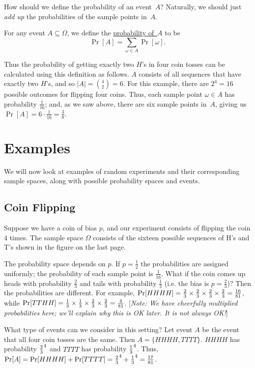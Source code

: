 \documentclass[11pt,fleqn]{article}
\begin{document}
How should we define the probability of an event~$A$?  Naturally,
we should just {\it add up\/} the probabilities of the sample points in~$A$.

For any event $A \subseteq \Omega$, we define the \underline{probability of~$A$}
to be $$
   \Pr[A] = \sum_{\omega\in A} \Pr[\omega].  $$

Thus the probability of getting exactly two $H$'s in four coin tosses
can be calculated using this definition as follows. $A$ consists of all
sequences that have exactly two $H$'s, and so $|A| ={4\choose 2}= 6$. 
For this example, there are $2^4 = 16$ possible outcomes for flipping four coins. 
Thus, each sample point $\omega \in A$ has probability $\frac{1}{16}$; and, as 
we saw above, there are six sample points in~$A$, giving us
$\Pr[A] = 6 \cdot \frac{1}{16} = \frac{3}{8}$.

\section*{Examples}

We will now look at examples of random experiments and 
their corresponding sample spaces, along with possible probability spaces and events. 

\subsection*{Coin Flipping}
Suppose we have a coin of bias $p$, and our experiment consists of flipping the coin $4$ times. 
The sample space $\Omega$ consists of the sixteen possible sequences of H's and T's shown 
in the figure on the last page. 

The probability space depends on $p$. If $p = \frac{1}{2}$ the probabilities are assigned uniformly; the probability
of each sample point is $\frac{1}{16}$. What if the coin comes up heads with
probability $\frac{2}{3}$ and tails with probability $\frac{1}{3}$ (i.e. the bias is $p = \frac{2}{3}$)?
Then the probabilities are different. 
For example,
$\Pr[HHHH]={2\over 3}\times{2\over 3}\times{2\over 3}\times{2\over 3}={16\over{81}}$,
while $\Pr[TTHH]={1\over 3}\times{1\over 3}\times{2\over 3}\times{2\over 3}={4\over{81}}$.
[{\it Note: We have cheerfully\/ {\rm multiplied} probabilities here;
we'll explain why this is OK later.  It is\/ {\rm not} always OK!\/}]

What type of events can we consider in this setting? Let event $A$ be the event that 
all four coin tosses are the same. Then $A = \{HHHH,TTTT\}$. 
$HHHH$ has probability ${2\over 3}^4$ and $TTTT$ has probability 
${1\over 3}^4$. Thus, $\Pr[A] = \Pr[HHHH] + \Pr[TTTT] = {2\over 3}^4 + {1\over 3}^4 = {17\over{81}}$. 
\end{document}
